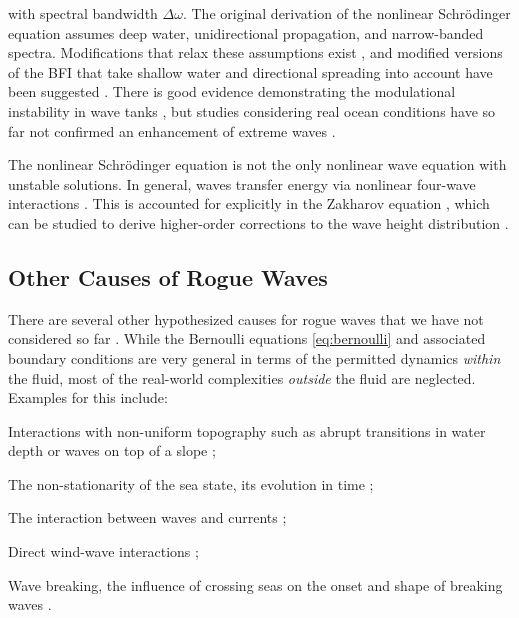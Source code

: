 with spectral bandwidth $\Delta \omega$. The original derivation of the nonlinear Schrödinger equation assumes deep water, unidirectional propagation, and narrow-banded spectra. Modifications that relax these assumptions exist \citep{davey_three-dimensional_1974,dysthe_note_1979}, and modified versions of the BFI that take shallow water and directional spreading into account have been suggested \citep{serio_computation_2005,fedele_kurtosis_2015}. There is good evidence demonstrating the modulational instability in wave tanks \citep{onorato_extreme_2006}, but studies considering real ocean conditions have so far not confirmed an enhancement of extreme waves \citep{gramstad_influence_2007,xiao_rogue_2013}.

The nonlinear Schrödinger equation is not the only nonlinear wave equation with unstable solutions. In general, waves transfer energy via nonlinear four-wave interactions \citep{hasselmann_feynman_1966}. This is accounted for explicitly in the Zakharov equation \citep{zakharov_stability_1968}, which can be studied to derive higher-order corrections to the wave height distribution \citep[\eg as in][]{janssen_nonlinear_2003}.

\subsection{Other Causes of Rogue Waves}

There are several other hypothesized causes for rogue waves that we have not considered so far \citep[see][for reviews]{adcock_physics_2014,slunyaev_rogue_2011,dudley_rogue_2019}. While the Bernoulli equations \eqref{eq:bernoulli} and associated boundary conditions are very general in terms of the permitted dynamics \emph{within} the fluid, most of the real-world complexities \emph{outside} the fluid are neglected. Examples for this include:

\begin{items}
    \item Interactions with non-uniform topography such as abrupt transitions in water depth or waves on top of a slope \citep{trulsen_laboratory_2012};
    \item The non-stationarity of the sea state, \ie its evolution in time \citep{trulsen_rogue_2018};
    \item The interaction between waves and currents \citep{mallory_abnormal_1974,didenkulova_rogue_2021,onorato_triggering_2011};
    \item Direct wind-wave interactions \citep{adcock_energy_2011};
    \item Wave breaking, \eg the influence of crossing seas on the onset and shape of breaking waves \citep{mcallister_laboratory_2019}.
\end{items}

